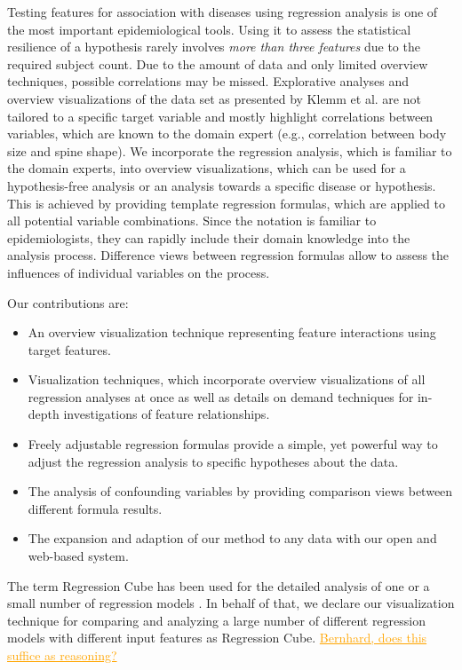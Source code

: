 \documentclass[journal]{style/vgtc} 			          %
\newcommand{\com}[1]{\textcolor{orange}{\uline{#1}}}
\begin{document}
Testing features for association with diseases using regression analysis is one of the most important epidemiological tools.
Using it to assess the statistical resilience of a hypothesis rarely involves \emph{more than three features} due to the required subject count.
Due to the amount of data and only limited overview techniques, possible correlations may be missed.
Explorative analyses and overview visualizations of the data set as presented by Klemm et al. \cite{Klemm2014VIS} are not tailored to a specific target variable and mostly highlight correlations between variables, which are known to the domain expert (e.g., correlation between body size and spine shape).
We incorporate the regression analysis, which is familiar to the domain experts, into overview visualizations, which can be used for a hypothesis-free analysis or an analysis towards a specific disease or hypothesis.
This is achieved by providing template regression formulas, which are applied to all potential variable combinations.
Since the notation is familiar to epidemiologists, they can rapidly include their domain knowledge into the analysis process.
Difference views between regression formulas allow to assess the influences of individual variables on the process.

Our contributions are:
\begin{itemize}
	\item An overview visualization technique representing feature interactions using target features.
	\item Visualization techniques, which incorporate overview visualizations of all regression analyses at once as well as details on demand techniques for in-depth investigations of feature relationships.
	\item Freely adjustable regression formulas provide a simple, yet powerful way to adjust the regression analysis to specific hypotheses about the data.
	\item The analysis of confounding variables by providing comparison views between different formula results.
	\item The expansion and adaption of our method to any data with our open and web-based system.
\end{itemize}
The term Regression Cube has been used for the detailed analysis of one or a small number of regression models \cite{Chan, Ahmadi}.
In behalf of that, we declare our visualization technique for comparing and analyzing a large number of different regression models with different input features as Regression Cube.
\com{Bernhard, does this suffice as reasoning?}
\end{document}
